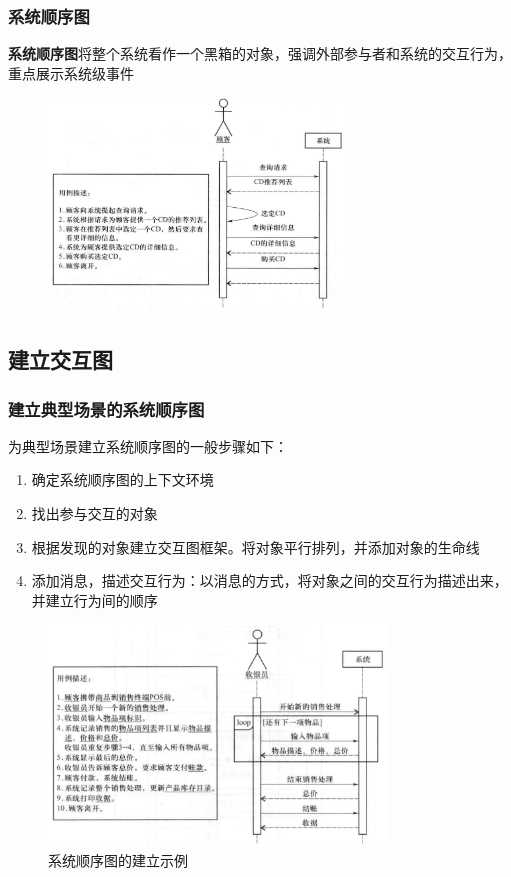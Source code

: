 \subsubsection{系统顺序图}
\textbf{系统顺序图}将整个系统看作一个黑箱的对象，强调外部参与者和系统的交互行为，重点展示系统级事件 
\begin{figure}[H]
	\centering
    \vspace{-0.2em}
	\includegraphics[width=0.7\textwidth]{img/系统顺序图示例.png}
    \vspace{-1em}
\end{figure}


\subsection{建立交互图}

\subsubsection{建立典型场景的系统顺序图}
为典型场景建立系统顺序图的一般步骤如下：
\begin{enumerate}[label=\arabic*.]
    \item 确定系统顺序图的上下文环境
    \item 找出参与交互的对象
    \item 根据发现的对象建立交互图框架。将对象平行排列，并添加对象的生命线
    \item 添加消息，描述交互行为：以消息的方式，将对象之间的交互行为描述出来，并建立行为间的顺序
\end{enumerate}

\begin{figure}[H]
	\centering
    \vspace{-0.2em}
	\includegraphics[width=0.8\textwidth]{img/系统顺序图的建立示例.png}
    \caption*{系统顺序图的建立示例}
    \vspace{-1em}
\end{figure}


